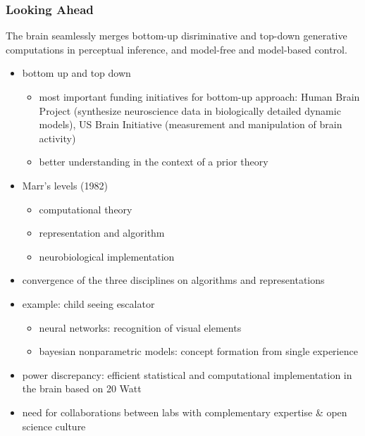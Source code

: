 \documentclass[
t, %
10pt, %
aspectratio=1610, %
ngerman,
english,
]{beamer}
\begin{document}
\begin{frame}
    \frametitle{Looking Ahead}
    The brain seamlessly merges bottom-up disriminative and top-down generative computations in perceptual inference, and model-free and model-based control.
    \begin{itemize}
     \item bottom up and top down
     \begin{itemize}
      \item most important funding initiatives for bottom-up approach: Human Brain Project (synthesize neuroscience data in biologically detailed dynamic models), US Brain Initiative (measurement and manipulation of brain activity)
      \item better understanding in the context of a prior theory
     \end{itemize}
    \item Marr's levels (1982)
    \begin{itemize}
     \item computational theory
     \item representation and algorithm
     \item neurobiological implementation
    \end{itemize}
    \item \textrightarrow convergence of the three disciplines on algorithms and representations
    \item example: child seeing escalator
    \begin{itemize}
     \item neural networks: recognition of visual elements
     \item bayesian nonparametric models: concept formation from single experience
    \end{itemize}
    \item power discrepancy: efficient statistical and computational implementation in the brain based on 20 Watt
    \item \textrightarrow need for collaborations between labs with complementary expertise \& open science culture
    \end{itemize}
\end{frame}
\end{document}
